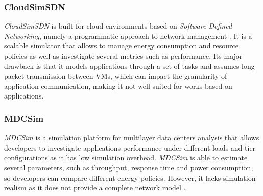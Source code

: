 {\subsubsection*{CloudSimSDN}
\emph{CloudSimSDN} \cite{son2015cloudsimsdn} is built for cloud environments based on \emph{Software Defined Networking}, namely a programmatic approach to network management \cite{benzekki2016software}. It is a scalable simulator that allows to manage energy consumption and resource policies as well as investigate several metrics such as performance. Its major drawback is that it models applications through a set of tasks and assumes long packet transmission between VMs, which can impact the granularity of application communication, making it not well-suited for works based on applications. \cite{khalil2017cloud} \cite{abreu2020comparative}
\subsubsection*{MDCSim}
\emph{MDCSim} \cite{lim2009mdcsim} is a simulation platform for multilayer data centers analysis that allows developers to investigate applications performance under different loads and tier configurations as it has low simulation overhead. \emph{MDCSim} is able to estimate several parameters, such as throughput, response time and power consumption, so developers can compare different energy policies. However, it lacks simulation realism as it does not provide a complete network model \cite{mansouri2020cloud} \cite{patel2016comprehensive}.
}
